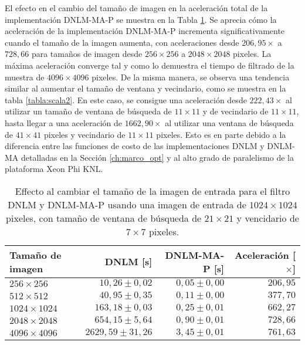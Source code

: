 El efecto en el cambio del tama\~no de imagen en la aceleración total de la implementación DNLM-MA-P se muestra en la Tabla \ref{tabla:scala1}. Se aprecia cómo la aceleración de la implementación DNLM-MA-P incrementa significativamente cuando el tama\~no de la imagen aumenta, con aceleraciones desde $206,95\times$ a $728,66$ para tama\~nos de imagen desde $256 \times 256$ a $2048 \times 2048$ pixeles. La máxima aceleración converge tal y como lo demuestra el tiempo de filtrado de la muestra de $4096\times 4096$ pixeles.  
De la misma manera, se observa una tendencia similar al aumentar el tama\~no de ventana y vecindario, como se muestra en la tabla \ref{tabla:scala2}. En este caso, se consigue una aceleración desde $222,43\times$ al utilizar un tama\~no de ventana de búsqueda de $11 \times 11$ y de vecindario de $11 \times 11$, hasta llegar a una aceleración de $1662,90\times$ al utilizar una ventana de búsqueda de $41 \times 41$ pixeles y vecindario de $11 \times 11$ pixeles. Esto es en parte debido a la diferencia entre las funciones de costo de las implementaciones DNLM y DNLM-MA detalladas en la Sección \ref{ch:marco_opt} y al alto grado de paralelismo de la plataforma Xeon Phi KNL.


\begin{table}[htb]
\protect\caption[Efecto al cambiar tama\~no de imagen de entrada]{Effecto al cambiar el tama\~no de la imagen de entrada para el filtro DNLM y DNLM-MA-P usando una imagen de entrada de  $1024 \times 1024$ pixeles, con tama\~no de ventana de búsqueda de $21 \times 21$ y vencidario de $7 \times 7$ pixeles. \label{tabla:scala1}}
\centering
\begin{tabular}{lrrr}
Tama\~no de imagen & DNLM [s]& DNLM-MA-P [s]& Aceleración [$\times$] \tabularnewline
\hline
$256 \times 256$ & $10,26\pm0,02$ & $0,05\pm0,00$ & $206,95$ \tabularnewline
$512 \times 512$ & $40,95\pm0,35$ & $0,11\pm0,00$ & $377,70$ \tabularnewline
$1024 \times 1024$ & $163,18\pm0,03$ & $0,25\pm0,01$ & $662,27$ \tabularnewline
$2048 \times 2048$ & $654,15\pm5,64$ & $0,90\pm0,01$ & $728,66$ \tabularnewline
$4096 \times 4096$ & $2629,59\pm31,26$ & $3,45\pm0,01$ & $761,63$ \tabularnewline
\end{tabular}
\end{table}


